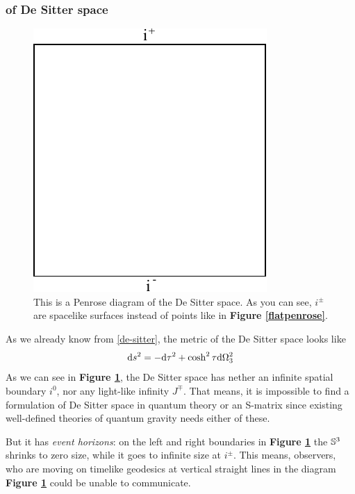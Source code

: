 	\subsubsection{of De Sitter space \checkmark}
	\FloatBarrier
	\begin{figure}[tbp]
	 	\begin{center}
			\includegraphics[scale=0.8]{dspenrose}
		\end{center}
	  		\caption{This is a Penrose diagram of the De Sitter space. As you can see, $i^{\pm}$ are spacelike surfaces instead of points like in \textbf{Figure \ref{flatpenrose}}.}\label{dspenrose}
	\end{figure}
	As we already know from \eqref{de-sitter}, the metric of the De Sitter space looks like
		\begin{equation}
			\mathrm{d} s^2=- \mathrm{d} \tau^2+\cosh^2\tau \mathrm{d} \Omega^2_3
		\end{equation}
	As we can see in \textbf{Figure \ref{dspenrose}}, the De Sitter space has nether an infinite spatial boundary $i^0$, nor any light-like infinity $J^\mp$. That means, it is impossible to find a formulation of De Sitter space in quantum theory or an S-matrix since existing well-defined theories of quantum gravity needs either of these. 
		
	But it has \textit{event horizons}: on the left and right boundaries in \textbf{Figure \ref{dspenrose}} the $\mathbb{S}^3$ shrinks to zero size, while it goes to infinite size at $i^{\pm}$. This means, observers, who are moving on timelike geodesics at vertical straight lines in the diagram \textbf{Figure \ref{dspenrose}} could be unable to communicate.
	 
